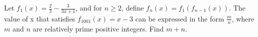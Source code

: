 Let $f_1(x) = \frac{2}{3}-\frac{3}{3x+1}$, and for $n \ge 2$, define $f_n(x) = f_1(f_{n-1} (x))$. The value of x that satisfies $f_{1001}(x) = x - 3$ can be expressed in the form $\frac{m}{n}$,
where $m$ and $n$ are relatively prime positive integers. Find $m + n$.